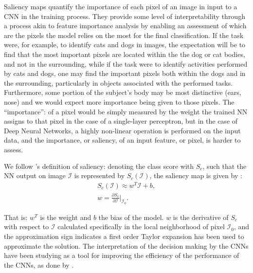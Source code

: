 
Saliency maps quantify the importance of each pixel of an image in input to a CNN in the training process. They provide some level of interpretability through a process akin to feature importance analysis by enabling  an assessment of which are the pixels the model relies on the most for the final classification. If the task were, for example, to identify cats and dogs in images, the expectation will be to find that the most important pixels are located within the the dog or cat bodies, and not in the surrounding, while if the task were to identify activities performed by cats and dogs, one may find the important pixels both within the dogs and in the surrounding, particularly in objects associated with the performed tasks. Furthermore, some portion of the subject's body may be most distinctive (ears, nose) and we would expect more importance being given to those pixels. The ``importance'': of a pixel would be simply measured by the weight the trained NN assigns to that pixel in the case of a single-layer perceptron, but in the case of Deep Neural Networks, a highly non-linear operation is performed on the input data, and the importance, or saliency, of an input feature, or pixel, is harder to assess. 

We follow \citep{simonyan2014deep}'s definition of saliency: denoting the class score with $S_c$, such that the NN output on image $\mathcal{I}$ is represented by $S_c(\mathcal{I})$, the saliency map is given by :
\begin{eqnarray}
 S_c(\mathcal{I}) \approx w^T \mathcal{I} + b,\\
 w = \frac{\partial S_c}{\partial \mathcal{I}} \biggr\rvert_{\mathcal{I}_0}.
 \end{eqnarray}
 
That is: $w^T$ is the weight and $b$ the bias of the model. $w$ is the derivative of $S_c$ with respect to $\mathcal{I}$ calculated specifically in the local neighborhood of pixel $\mathcal{I}_0$, and the approximation sign indicates a first order Taylor expansion has been used to approximate the solution.
The interpretation of the decision making by the CNNs have been studying as a tool for improving the efficiency of the performance of the CNNs, as done by \citep{DBLP:journals/corr/abs-2105-00937}. 


